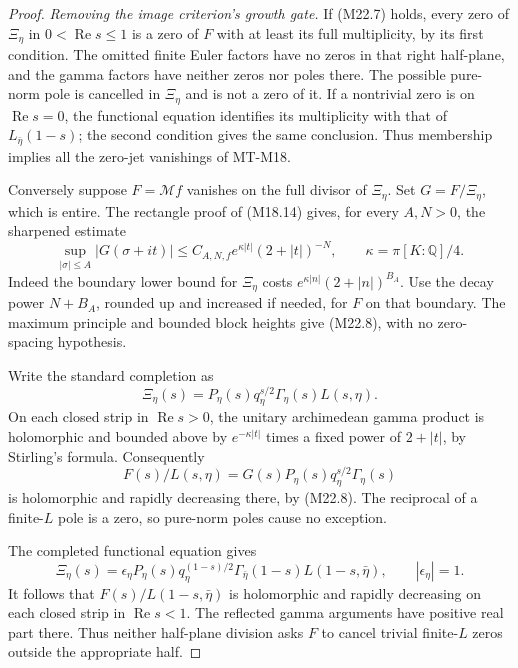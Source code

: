 \begin{proof}
\emph{Removing the image criterion's growth gate.}
If (M22.7) holds, every zero of \(\Xi_\eta\) in
\(0<\operatorname{Re}s\le1\) is a zero of \(F\)
with at least its full multiplicity, by its first
condition.  The omitted finite Euler factors have
no zeros in that right half-plane, and the gamma
factors have neither zeros nor poles there.
The possible pure-norm pole is cancelled in
\(\Xi_\eta\) and is not a zero of it.
If a nontrivial zero is on \(\operatorname{Re}s=0\),
the functional equation identifies its multiplicity
with that of \(L_{\bar\eta}(1-s)\); the second
condition gives the same conclusion.
Thus membership implies all the zero-jet
vanishings of MT-M18.

Conversely suppose \(F=\mathcal Mf\) vanishes
on the full divisor of \(\Xi_\eta\).
Set \(G=F/\Xi_\eta\), which is entire.
The rectangle proof of (M18.14) gives,
for every \(A,N>0\), the sharpened estimate
\[
 \sup_{|\sigma|\le A}|G(\sigma+it)|
       \le C_{A,N,f}e^{\kappa|t|}(2+|t|)^{-N},
 \qquad \kappa=\pi[K:\mathbb Q]/4.                              \tag{M22.8}
\]
Indeed the boundary lower bound for \(\Xi_\eta\)
costs \(e^{\kappa|n|}(2+|n|)^{B_A}\).
Use the decay power \(N+B_A\), rounded up and
increased if needed, for \(F\) on that boundary.
The maximum principle and bounded block heights
give (M22.8), with no zero-spacing hypothesis.

Write the standard completion as
\[
 \Xi_\eta(s)=P_\eta(s)q_\eta^{s/2}
                  \Gamma_\eta(s)L(s,\eta).
\]
On each closed strip in \(\operatorname{Re}s>0\),
the unitary archimedean gamma product is
holomorphic and bounded above by
\(e^{-\kappa|t|}\) times a fixed power
of \(2+|t|\), by Stirling's formula.
Consequently
\[
        F(s)/L(s,\eta)
          =G(s)P_\eta(s)q_\eta^{s/2}\Gamma_\eta(s)
\]
is holomorphic and rapidly decreasing there,
by (M22.8).  The reciprocal of a finite-\(L\)
pole is a zero, so pure-norm poles cause
no exception.

The completed functional equation gives
\[
 \Xi_\eta(s)
   =\epsilon_\eta P_\eta(s)q_\eta^{(1-s)/2}
            \Gamma_{\bar\eta}(1-s)L(1-s,\bar\eta),
                    \qquad|\epsilon_\eta|=1.
\]
It follows that \(F(s)/L(1-s,\bar\eta)\)
is holomorphic and rapidly decreasing
on each closed strip in
\(\operatorname{Re}s<1\).
The reflected gamma arguments have positive
real part there.  Thus neither half-plane
division asks \(F\) to cancel trivial
finite-\(L\) zeros outside the appropriate half.


\end{proof}
